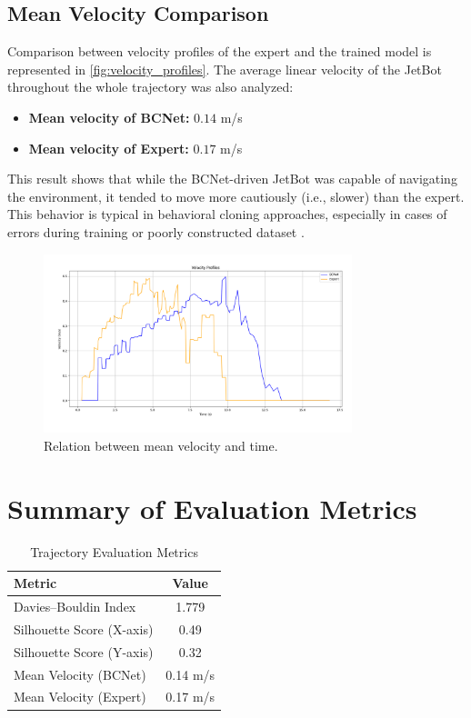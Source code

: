 \subsection{Mean Velocity Comparison}

Comparison between velocity profiles of the expert and the trained model is represented in \autoref{fig:velocity_profiles}. The average linear velocity of the JetBot throughout the whole trajectory was also analyzed:

\begin{itemize}
  \item \textbf{Mean velocity of BCNet:} $0.14$ m/s
  \item \textbf{Mean velocity of Expert:} $0.17$ m/s
\end{itemize}

This result shows that while the BCNet-driven JetBot was capable of navigating the environment, it tended to move more cautiously (i.e., slower) than the expert. This behavior is typical in behavioral cloning approaches, especially in cases of errors during training or poorly constructed dataset \autocite{bühler2020drivingghostsbehavioralcloning}.

\begin{figure}[H]
  \centering
  \includegraphics[width=0.8\textwidth]{Images/Evaluation/velocity_profiles.png}
  \caption{Relation between mean velocity and time.}
  \label{fig:velocity_profiles}
\end{figure}

\section{Summary of Evaluation Metrics}

\begin{table}[H]
  \centering
  \caption{Trajectory Evaluation Metrics}
  \label{tab:evaluation_metrics}
  \begin{tabular}{|l|c|}
    \hline
    \textbf{Metric} & \textbf{Value} \\
    \hline
    Davies–Bouldin Index & 1.779 \\
    Silhouette Score (X-axis) & 0.49 \\
    Silhouette Score (Y-axis) & 0.32 \\
    Mean Velocity (BCNet) & 0.14 m/s \\
    Mean Velocity (Expert) & 0.17 m/s \\
    \hline
  \end{tabular}
\end{table}